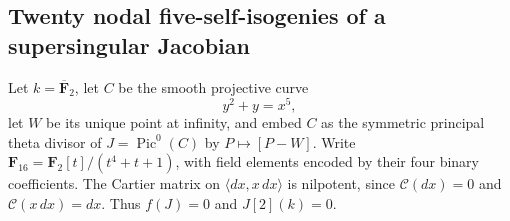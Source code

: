 \subsection{Twenty nodal five-self-isogenies of a supersingular Jacobian}
\label{subsec:five-theta-self-isogenies-candidate}

Let $k=\overline{\mathbf F}_2$, let $C$ be the smooth projective curve
\[
                         y^2+y=x^5,
\]
let $W$ be its unique point at infinity, and embed $C$ as the symmetric
principal theta divisor of $J=\operatorname{Pic}^0(C)$ by $P\mapsto[P-W]$.
Write $\mathbf F_{16}=\mathbf F_2[t]/(t^4+t+1)$, with field elements
encoded by their four binary coefficients. The Cartier matrix on
$\langle dx,x\,dx\rangle$ is nilpotent, since $\mathcal C(dx)=0$
and $\mathcal C(x\,dx)=dx$. Thus $f(J)=0$ and $J[2](k)=0$.

